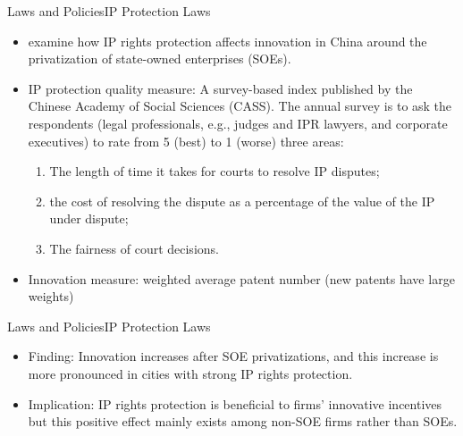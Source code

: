 \documentclass{beamer}
\begin{document}
    \begin{frame}{Laws and Policies}{IP Protection Laws}
        \begin{itemize}
            \item \citet{FLW2017IntellectualPropertyRights} examine how IP rights protection affects innovation in China around the privatization of state-owned enterprises (SOEs).
            \item IP protection quality measure: A survey-based index published by the Chinese Academy of Social Sciences (CASS). The annual survey is to ask the respondents (legal professionals, e.g., judges and IPR lawyers, and corporate executives) to rate from 5 (best) to 1 (worse) three areas:
            \begin{enumerate}
                \item The length of time it takes for courts to resolve IP disputes;
                \item the cost of resolving the dispute as a percentage of the value of the IP under dispute;
                \item The fairness of court decisions.
            \end{enumerate}
            \item Innovation measure: weighted average patent number (new patents have large weights)
        \end{itemize}
    \end{frame}

    \begin{frame}{Laws and Policies}{IP Protection Laws}
        \vspace{-1cm}
        \begin{itemize}
            \item Finding: Innovation increases after SOE privatizations, and this increase is more pronounced in cities with strong IP rights protection.
            \item Implication: IP rights protection is beneficial to firms' innovative incentives but this positive effect mainly exists among non-SOE firms rather than SOEs.
        \end{itemize}
    \end{frame}
\end{document}
